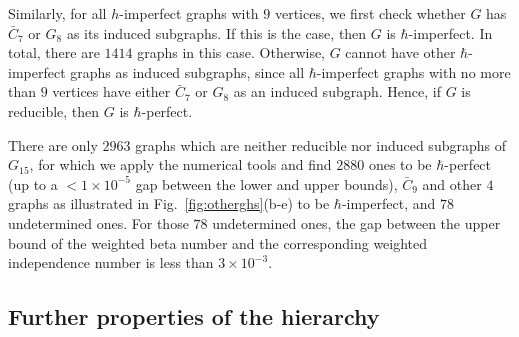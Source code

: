 Similarly, for all $h$-imperfect graphs with $9$ vertices, we first check whether $G$ has $\bar{C}_7$ or $G_8$ as its induced subgraphs. If this is the case, then $G$ is $\hbar$-imperfect. In total, there are $1414$ graphs in this case. Otherwise, $G$ cannot have other $\hbar$-imperfect graphs as induced subgraphs, since all $\hbar$-imperfect graphs with no more than $9$ vertices have either $\bar{C}_7$ or $G_8$ as an induced subgraph. Hence, if $G$ is reducible, then $G$ is $\hbar$-perfect.

There are only $2963$ graphs which are neither reducible nor induced subgraphs of $G_{15}$, for which we apply the numerical tools and find $2880$ ones to be $\hbar$-perfect (up to a $<1\times10^{-5}$ gap between the lower and upper bounds), $\bar{C}_9$ and other $4$ graphs as illustrated in Fig.~\ref{fig:otherghs}(b-e) to be $\hbar$-imperfect, and $78$ undetermined ones. For those $78$ undetermined ones, the gap between the upper bound of the weighted beta number and the corresponding weighted independence number is less than $3\times10^{-3}$.




\subsection{Further properties of the hierarchy}
\label{ssec:hierprop}

